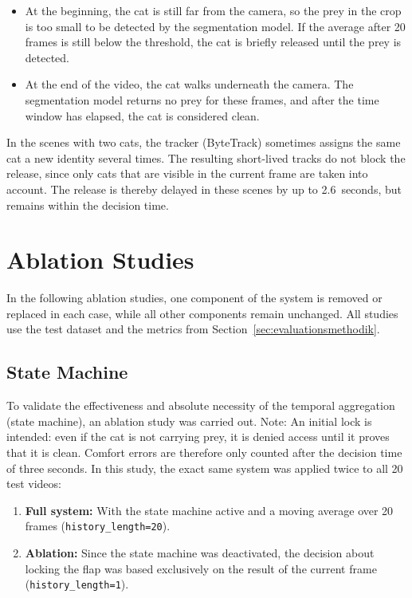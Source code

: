 \begin{itemize}
    \item At the beginning, the cat is still far from the camera, so the prey in the crop is too small to be detected by the segmentation model. If the average after 20 frames is still below the threshold, the cat is briefly released until the prey is detected.
    \item At the end of the video, the cat walks underneath the camera. The segmentation model returns no prey for these frames, and after the time window has elapsed, the cat is considered clean.
\end{itemize}

In the scenes with two cats, the tracker (ByteTrack) sometimes assigns the same cat a new identity several times. The resulting short-lived tracks do not block the release, since only cats that are visible in the current frame are taken into account. The release is thereby delayed in these scenes by up to 2.6~seconds, but remains within the decision time.

\section{Ablation Studies}
In the following ablation studies, one component of the system is removed or replaced in each case, while all other components remain unchanged. All studies use the test dataset and the metrics from Section~\ref{sec:evaluationsmethodik}.

\subsection{State Machine}
\label{sec:ablation_sm}
To validate the effectiveness and absolute necessity of the temporal aggregation (state machine), an ablation study was carried out. Note: An initial lock is intended: even if the cat is not carrying prey, it is denied access until it proves that it is clean. Comfort errors are therefore only counted after the decision time of three seconds. In this study, the exact same system was applied twice to all 20 test videos:

\begin{enumerate}
    \item \textbf{Full system:} With the state machine active and a moving average over 20 frames (\texttt{history\_length=20}).
    \item \textbf{Ablation:} Since the state machine was deactivated, the decision about locking the flap was based exclusively on the result of the current frame (\texttt{history\_length=1}).
\end{enumerate}


